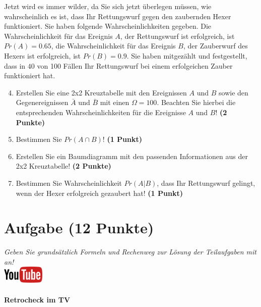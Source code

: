 \documentclass[a4paper, 9pt]{scrartcl}\usepackage[]{graphicx}\usepackage[]{xcolor}
\begin{document}
Jetzt wird es immer wilder, da Sie sich jetzt {\"u}berlegen m{\"u}ssen, wie
wahrscheinlich es ist, dass Ihr Rettungswurf gegen den zaubernden Hexer
funktioniert. Sie haben folgende Wahrscheinlichkeiten gegeben. Die
Wahrscheinlichkeit f{\"u}r das Ereignis $A$, der Rettungswurf ist erfolgreich,
ist $Pr(A) = 0.65$, die Wahrscheinlichkeit f{\"u}r das Ereignis $B$,
der Zauberwurf des Hexers ist erfolgreich, ist $Pr(B) = 0.9$. Sie
haben mitgez{\"a}hlt und festgestellt, dass in $40$ von 100 F{\"a}llen
Ihr Rettungswurf bei einem erfolgeichen Zauber funktioniert hat.  

\begin{enumerate}
  \setcounter{enumi}{3}
\item Erstellen Sie eine 2x2 Kreuztabelle mit den Ereignissen $A$ und $B$
  sowie den Gegenereignissen $\bar{A}$ und $\bar{B}$ mit einen
  $\Omega = 100$. Beachten Sie hierbei die entsprechenden
  Wahrscheinlichkeiten f{\"u}r die Ereignisse $A$ und $B$! \textbf{(2 Punkte)}
\item Bestimmen Sie $Pr(A \cap B)$! \textbf{(1 Punkt)}
\item Erstellen Sie ein Baumdiagramm mit den passenden Informationen aus der 2x2
  Kreuztabelle! \textbf{(2 Punkte)}
\item Bestimmen Sie Wahrscheinlichkeit $Pr(A|B)$, dass Ihr Rettungswurf gelingt, wenn
  der Hexer erfolgreich gezaubert hat! \textbf{(1 Punkt)}
\end{enumerate}

  
\clearpage

\section{Aufgabe \hfill (12 Punkte)}

\textit{Geben Sie grunds{\"a}tzlich Formeln und Rechenweg zur L{\"o}sung der
  Teilaufgaben mit an!} \\[1Ex]

\hfill\href{https://youtu.be/9DQKaXdxT_g}{\includegraphics[width =
  2cm]{img/youtube}} %
\hspace{2Ex}

\paragraph{Retrocheck im TV}
\end{document}
